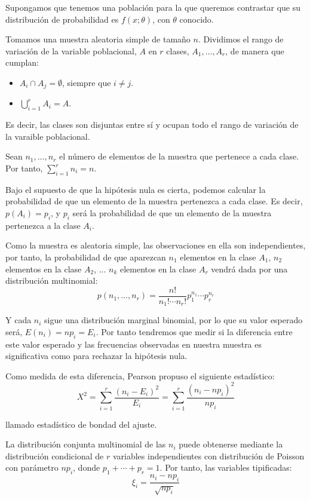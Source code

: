 
Supongamos que tenemos una poblaci\'on para la que queremos contrastar que su distribuci\'on de probabilidad es $f(x;\theta)$, con $\theta$ conocido.

Tomamos una muestra aleatoria simple de tama\~no $n$. Dividimos el rango de variaci\'on de la variable poblacional, $A$ en $r$ clases, $A_1,\ldots, A_r$, de manera que cumplan:

\begin{itemize}
\item $A_i\cap A_j=\emptyset$, siempre que $i\neq j$.
\item $\bigcup_{i=1}^rA_i=A$.
\end{itemize}

Es decir, las clases son disjuntas entre s\'i y ocupan todo el rango de variaci\'on de la varaible poblacional.

Sean $n_1,\ldots,n_r$ el n\'umero de elementos de la muestra que pertenece a cada clase. Por tanto, $\sum_{i=1}^rn_i=n$.

Bajo el supuesto de que la hip\'otesis nula es cierta, podemos calcular la probabilidad de que un elemento de la muestra pertenezca a cada clase. Es decir, $p(A_i)=p_i$, y $p_i$ ser\'a la probabilidad de que un elemento de la muestra pertenezca a la clase $A_i$.

Como la muestra es aleatoria simple, las observaciones en ella son independientes, por tanto, la probabilidad de que aparezcan $n_1$ elementos en la clase $A_1$, $n_2$ elementos en la clase $A_2$, ... $n_k$ elementos en la clase $A_r$ vendr\'a dada por una distribuci\'on multinomial:
\[p(n_1,\ldots,n_r)=\dfrac{n!}{n_1!\cdots n_r!}p_1^{n_1}\cdots p_r^{n_r}\]

Y cada $n_i$ sigue una distribuci\'on marginal binomial, por lo que su valor esperado ser\'a, $E(n_i)=np_i=E_i$. Por tanto tendremos que medir si la diferencia entre este valor esperado y las frecuencias observadas en nuestra muestra es significativa como para rechazar la hip\'otesis nula.

Como medida de esta diferencia, Pearson propuso el siguiente estad\'istico:
\[X^2=\sum_{i=1}^r\dfrac{(n_i-E_i)^2}{E_i}=\sum_{i=1}^r\dfrac{(n_i-np_i)^2}{np_i}\]

llamado estad\'istico de bondad del ajuste.

La distribuci\'on conjunta multinomial de las $n_i$ puede obtenerse mediante la distribuci\'on  condicional de $r$ variables independientes con distribuci\'on de Poisson con par\'ametro $np_i$, donde $p_1+\cdots+p_r=1$. Por tanto, las variables tipificadas:
\[\xi_i=\dfrac{n_i-np_i}{\sqrt{np_i}}\]


